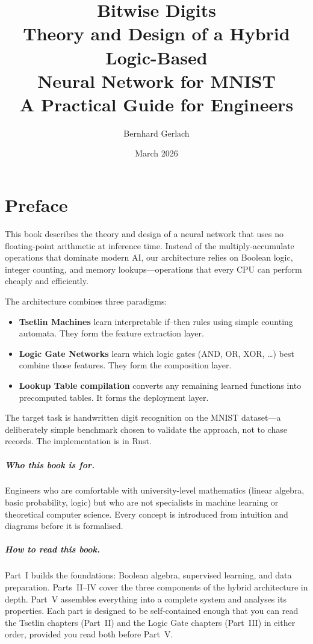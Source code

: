 \documentclass[11pt,a4paper,twoside,openright]{book}
\title{%
  \vspace{-2cm}
  {\Huge\bfseries Bitwise Digits}\\[1em]
  {\Large Theory and Design of a Hybrid Logic-Based\\
   Neural Network for MNIST}\\[2em]
  {\large A Practical Guide for Engineers}
}
\author{Bernhard Gerlach}
\date{March 2026}
\begin{document}

\maketitle
\thispagestyle{empty}

\frontmatter

\chapter*{Preface}

This book describes the theory and design of a neural network that uses no
floating-point arithmetic at inference time. Instead of the
multiply-accumulate operations that dominate modern AI, our architecture
relies on Boolean logic, integer counting, and memory lookups---operations
that every CPU can perform cheaply and efficiently.

The architecture combines three paradigms:
\begin{itemize}
  \item \textbf{Tsetlin Machines} learn interpretable if--then rules using
    simple counting automata. They form the feature extraction layer.
  \item \textbf{Logic Gate Networks} learn which logic gates (AND, OR,
    XOR, \ldots) best combine those features. They form the composition
    layer.
  \item \textbf{Lookup Table compilation} converts any remaining learned
    functions into precomputed tables. It forms the deployment layer.
\end{itemize}

The target task is handwritten digit recognition on the MNIST dataset---a
deliberately simple benchmark chosen to validate the approach, not to chase
records. The implementation is in Rust.

\paragraph{Who this book is for.}
Engineers who are comfortable with university-level mathematics (linear
algebra, basic probability, logic) but who are not specialists in machine
learning or theoretical computer science. Every concept is introduced from
intuition and diagrams before it is formalised.

\paragraph{How to read this book.}
Part~I builds the foundations: Boolean algebra, supervised learning, and
data preparation. Parts~II--IV cover the three components of the hybrid
architecture in depth. Part~V assembles everything into a complete system
and analyses its properties. Each part is designed to be self-contained
enough that you can read the Tsetlin chapters (Part~II) and the Logic Gate
chapters (Part~III) in either order, provided you read both before Part~V.
\end{document}
